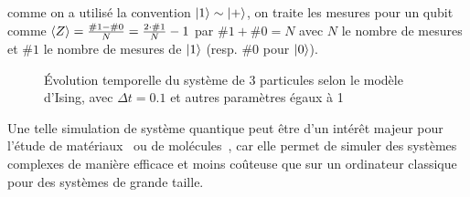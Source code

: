 comme on a utilisé la convention $\ket{1} \sim \ket{+}$, on traite les mesures pour un qubit comme
$\expval{Z} = \frac{\#1-\#0}{N} = \frac{2 \cdot \#1}{N} - 1$ par $\#1+\#0=N$ avec $N$ le nombre de mesures et
$\#1$ le nombre de mesures de $\ket{1}$ (resp. $\#0$ pour $\ket{0}$).
\begin{figure}[H]
    \centering
    \caption{Évolution temporelle du système de 3 particules selon le modèle d'Ising, avec $\Delta t = 0.1$ et autres paramètres égaux à 1}
    \label{fig:ising-evol-plot}
\end{figure}
Une telle simulation de système quantique peut être d'un intérêt majeur pour l'étude de matériaux~\cite{Ma2020}
ou de molécules~\cite{Ollitrault2021}, car elle permet de simuler des systèmes complexes de manière efficace et
moins coûteuse que sur un ordinateur classique pour des systèmes de grande taille.
